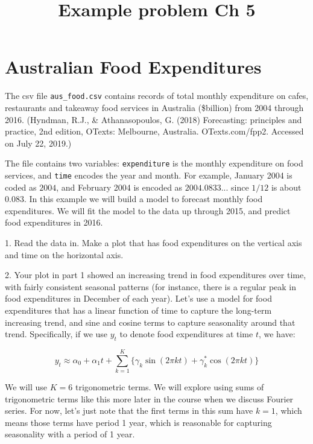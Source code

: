 \documentclass[]{article}
\title{Example problem Ch 5}
\author{}
\begin{document}
\maketitle

\begin{abstract}

\end{abstract}

\section{Australian Food Expenditures}

The csv file \verb`aus_food.csv` contains records of total monthly expenditure on
cafes, restaurants and takeaway food services in Australia (\$billion) from
2004 through 2016. (Hyndman, R.J., \& Athanasopoulos, G. (2018)
Forecasting: principles and practice, 2nd edition,
OTexts: Melbourne, Australia. OTexts.com/fpp2. Accessed on July 22, 2019.)

The file contains two variables: \verb`expenditure` is the monthly expenditure
on food services, and \verb`time` encodes the year and month. For example,
January 2004 is coded as $2004$, and February 2004 is encoded as $2004.0833$...
since $1/12$ is about $0.083$.
In this example we will build a model to forecast monthly food expenditures.
We will fit the model to the data up through 2015, and predict food expenditures
in 2016.

1. Read the data in.  Make a plot that has food expenditures on the vertical
axis and time on the horizontal axis.


2. Your plot in part 1 showed an increasing trend in food expenditures over
time, with fairly consistent seasonal patterns (for instance, there is a
regular peak in food expenditures in December of each year).  Let's use a
model for food expenditures that has a linear function of time to capture
the long-term increasing trend, and sine and cosine terms to capture
seasonality around that trend. Specifically, if we use $y_t$ to denote food
expenditures at time $t$, we have:

\begin{equation*}
y_t \approx \alpha_0 + \alpha_1 t + \sum_{k = 1}^K \{\gamma_{k} \sin\left( 2 \pi k t \right) + \gamma^*_{k} \cos\left( 2 \pi k t \right) \}
\end{equation*}

We will use $K = 6$ trigonometric terms.  We will explore
using sums of trigonometric terms like this more later in the course when we discuss
Fourier series.  For now, let's just note that the first terms in this sum have $k = 1$,
which means those terms have period 1 year, which is reasonable for capturing
seasonality with a period of 1 year.
\end{document}
